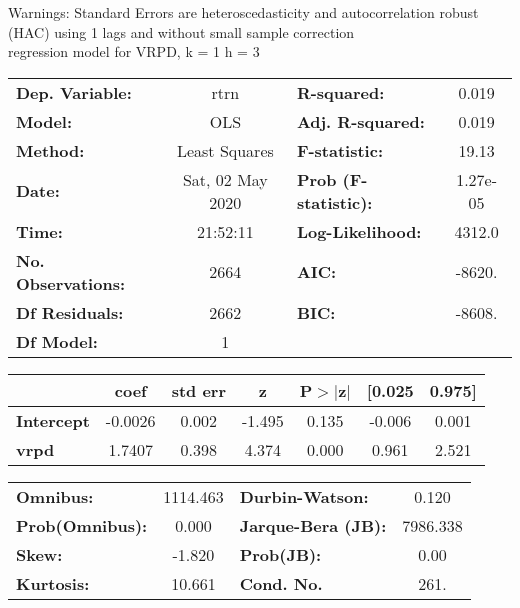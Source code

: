Warnings: \newline
 [1] Standard Errors are heteroscedasticity and autocorrelation robust (HAC) using 1 lags and without small sample correction\\ 

regression model for VRPD, k = 1 h = 3\begin{center}
\begin{tabular}{lclc}
\toprule
\textbf{Dep. Variable:}    &       rtrn       & \textbf{  R-squared:         } &     0.019   \\
\textbf{Model:}            &       OLS        & \textbf{  Adj. R-squared:    } &     0.019   \\
\textbf{Method:}           &  Least Squares   & \textbf{  F-statistic:       } &     19.13   \\
\textbf{Date:}             & Sat, 02 May 2020 & \textbf{  Prob (F-statistic):} &  1.27e-05   \\
\textbf{Time:}             &     21:52:11     & \textbf{  Log-Likelihood:    } &    4312.0   \\
\textbf{No. Observations:} &        2664      & \textbf{  AIC:               } &    -8620.   \\
\textbf{Df Residuals:}     &        2662      & \textbf{  BIC:               } &    -8608.   \\
\textbf{Df Model:}         &           1      & \textbf{                     } &             \\
\bottomrule
\end{tabular}
\begin{tabular}{lcccccc}
                   & \textbf{coef} & \textbf{std err} & \textbf{z} & \textbf{P$> |$z$|$} & \textbf{[0.025} & \textbf{0.975]}  \\
\midrule
\textbf{Intercept} &      -0.0026  &        0.002     &    -1.495  &         0.135        &       -0.006    &        0.001     \\
\textbf{vrpd}      &       1.7407  &        0.398     &     4.374  &         0.000        &        0.961    &        2.521     \\
\bottomrule
\end{tabular}
\begin{tabular}{lclc}
\textbf{Omnibus:}       & 1114.463 & \textbf{  Durbin-Watson:     } &    0.120  \\
\textbf{Prob(Omnibus):} &   0.000  & \textbf{  Jarque-Bera (JB):  } & 7986.338  \\
\textbf{Skew:}          &  -1.820  & \textbf{  Prob(JB):          } &     0.00  \\
\textbf{Kurtosis:}      &  10.661  & \textbf{  Cond. No.          } &     261.  \\
\bottomrule
\end{tabular}
\end{center}

